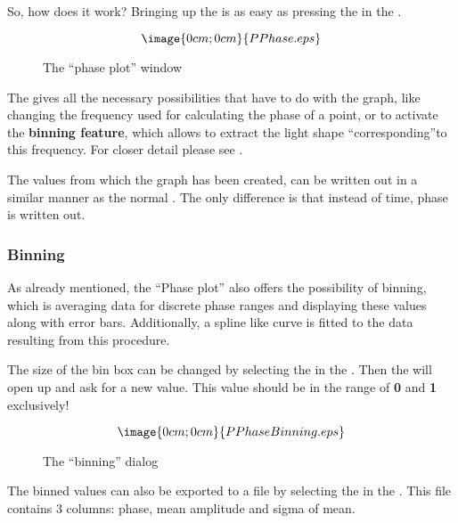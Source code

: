 

So, how does it work? Bringing up the 
is as easy as pressing the  in the
.
\begin{figure}[h]
$$\image{0cm;0cm}{PPhase.eps}$$%
\caption{The ``phase plot'' window}%
\label{period.phase.window}
\end{figure}

The  gives all the necessary possibilities that have to do
with the graph, like changing the frequency used for calculating
the phase of a point,
or to activate the {\bf binning feature}, which allows to extract the 
light shape ``corresponding''to this frequency. 
For closer detail please see .

The values from which the graph has been created, can be written out in a 
similar manner as the normal 
%
. The only difference is that instead of time, phase is written out.

\subsubsection{Binning}%
\label{period.phase.binning}
As already mentioned, the ``Phase plot'' also offers the possibility of 
binning, which is averaging data for discrete phase ranges 
and displaying these values along with error bars.
Additionally, a spline like curve is fitted to the data resulting from this 
procedure.

The size of the bin box can be changed by selecting the
 in the .
Then the 
will open up and ask for a new value. This value should be in the 
range of {\bf 0} and {\bf 1} exclusively!
\begin{figure}[h]
$$\image{0cm;0cm}{PPhaseBinning.eps}$$%
\caption{The ``binning'' dialog}%
\label{period.phase.binning.dialog}%
\end{figure}

The binned values can also be exported to a file by selecting the
 in the . This file contains
3 columns: phase, mean amplitude and sigma of mean.

